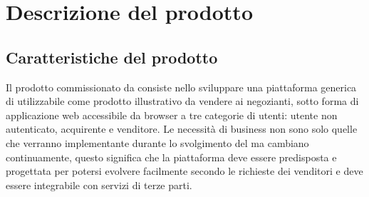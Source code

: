\section{Descrizione del prodotto} \label{Desc}
\subsection{Caratteristiche del prodotto}
Il prodotto \NomeProgetto{} commissionato da \Proponente{} consiste nello sviluppare una piattaforma generica di  utilizzabile come prodotto illustrativo da vendere ai negozianti, sotto forma di applicazione web accessibile da browser a tre categorie di utenti: utente non autenticato, acquirente e venditore. Le necessità di business non sono solo quelle che verranno implementante durante lo svolgimento del  ma cambiano continuamente, questo significa che la piattaforma deve essere predisposta e progettata per potersi evolvere facilmente secondo le richieste dei venditori e deve essere integrabile con servizi di terze parti.

